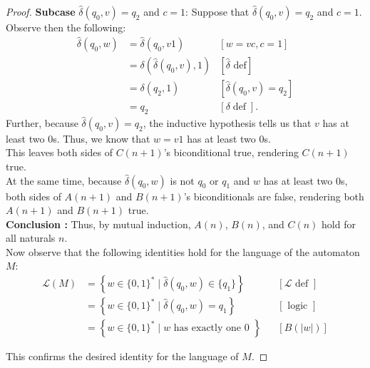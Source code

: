 \documentclass[10pt]{article}
\begin{document}
\begin{enumerate}[label={}]
\begin{proof}
              \textbf{Subcase }$\hat{\delta}\left(q_0, v\right)=q_2$ and $c=1$: Suppose that $\hat{\delta}\left(q_0, v\right)=q_2$ and $c=1$. Observe then the following:
              $$
                  \begin{aligned}
                      \hat{\delta}\left(q_0, w\right) & =\hat{\delta}\left(q_0, v 1\right)                    & {[w=v c, c=1] }                                     \\
                                                      & =\delta\left(\hat{\delta}\left(q_0, v\right),1\right) & {[\hat{\delta} \text { def}] }                      \\
                                                      & =\delta\left(q_2, 1\right)                            & {\left[\hat{\delta}\left(q_0, v\right)=q_2\right] } \\
                                                      & =q_2                                                  & {[\delta \operatorname{def}] . }
                  \end{aligned}
              $$
              Further, because $\hat{\delta}\left(q_0, v\right)=q_2$, the inductive hypothesis tells us that $v$ has at least two 0s. Thus, we know that $w=v1$ has at least two 0s.\\
              This leaves both sides of $C(n+1)$'s biconditional true, rendering $C(n+1)$ true.\\
              At the same time, because $\hat{\delta}\left(q_0, w\right)$ is not $q_0$ or $q_1$ and $w$ has at least two 0s, both sides of $A(n+1)$ and $B(n+1)$'s biconditionals are false, rendering both $A(n+1)$ and $B(n+1)$ true.\\

              \textbf{Conclusion :} Thus, by mutual induction, $A(n)$, $B(n)$, and $C(n)$ hold for all naturals $n$.\\
              Now observe that the following identities hold for the language of the automaton $M$:
              $$
                  \begin{aligned}
                      \mathcal{L}(M) & =\left\{w \in\{0, 1\}^* \mid \hat{\delta}(q_0, w) \in\{q_1\}\right\} &  & {[\mathcal{L} \text { def }] } \\
                                     & =\left\{w \in\{0, 1\}^* \mid \hat{\delta}(q_0, w)=q_1\right\}        &  & {[\text { logic }] }           \\
                                     & =\left\{w \in\{0, 1\}^* \mid w \text { has exactly one 0 }\right\}   &  & {[B(|w|)] }
                  \end{aligned}
              $$

              This confirms the desired identity for the language of $M$.
          \end{proof}

\end{enumerate}
\end{document}
